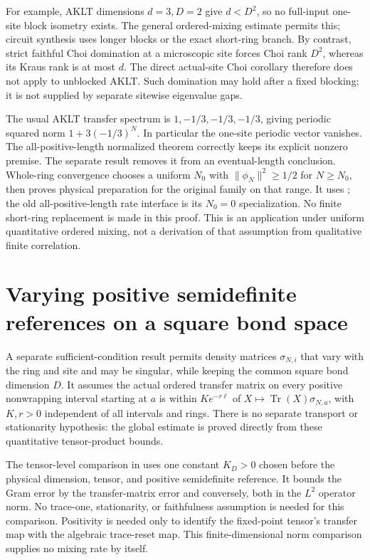 \documentclass{article}
\begin{document}
For example, AKLT dimensions $d=3,D=2$ give $d<D^2$, so no full-input
one-site block isometry exists. The general ordered-mixing estimate
permits this; circuit synthesis uses longer blocks or the exact short-ring
branch. By contrast, strict faithful Choi domination at a microscopic
site forces Choi rank $D^2$, whereas its Kraus rank is at most $d$.
The direct actual-site Choi corollary therefore does not apply to unblocked
AKLT. Such domination may hold after a fixed blocking; it is not supplied
by separate sitewise eigenvalue gaps.

The usual AKLT transfer spectrum is $1,-1/3,-1/3,-1/3$, giving periodic
squared norm $1+3(-1/3)^N$. In particular the one-site periodic vector
vanishes. The all-positive-length normalized theorem correctly keeps its
explicit nonzero premise. The separate result
removes it from an eventual-length conclusion. Whole-ring convergence
chooses a uniform $N_0$ with $\|\phi_N\|^2\ge1/2$ for $N\ge N_0$,
then proves physical preparation for the original family on that range.
It uses
;
the old all-positive-length rate interface is its $N_0=0$ specialization.
No finite short-ring replacement is made in this proof. This is an
application under uniform quantitative ordered mixing, not a derivation
of that assumption from qualitative finite correlation.


\section{Varying positive semidefinite references on a square bond space}
A separate sufficient-condition result permits density matrices
$\sigma_{N,i}$ that vary with the ring and site and may be singular, while
keeping the common square bond dimension $D$. It assumes the actual ordered
transfer matrix on every positive nonwrapping interval starting at $a$ is
within $K e^{-r\ell}$ of $X\mapsto\operatorname{Tr}(X)\sigma_{N,a}$,
with $K,r>0$ independent of all intervals and rings. There is no separate
transport or stationarity hypothesis: the global estimate is proved directly
from these quantitative tensor-product bounds.

The tensor-level comparison
 in
 uses one constant $K_D>0$
chosen before the physical dimension, tensor, and positive semidefinite
reference. It bounds the Gram error by the transfer-matrix error and
conversely, both in the $L^2$ operator norm. No trace-one, stationarity, or
faithfulness assumption is needed for this comparison. Positivity is
needed only to identify the fixed-point tensor's transfer map with the
algebraic trace-reset map. This finite-dimensional norm comparison
supplies no mixing rate by itself.
\end{document}
